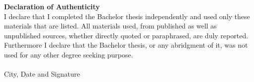 
\textbf{Declaration of Authenticity}\\[1em]
I declare that I completed the Bachelor thesis independently and used only these materials that are
listed. All materials used, from published as well as unpublished sources, whether directly quoted or
paraphrased, are duly reported.
Furthermore I declare that the Bachelor thesis, or any abridgment of it, was not used for any other
degree seeking purpose. \\[2em]
\underline{\hspace{10cm}} \\
City, Date and Signature